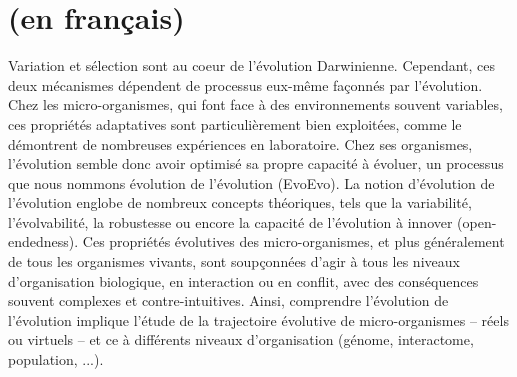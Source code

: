 

\section*{(en fran\c cais)}

Variation et s\'{e}lection sont au coeur de l'\'{e}volution Darwinienne. Cependant, ces deux m\'{e}canismes d\'{e}pendent de processus eux-m\^{e}me fa\c conn\'{e}s par l'\'{e}volution. Chez les micro-organismes, qui font face \`a des environnements souvent variables, ces propri\'{e}t\'{e}s adaptatives sont particuli\`erement bien exploit\'{e}es, comme le d\'{e}montrent de nombreuses exp\'{e}riences en laboratoire. Chez ses organismes, l'\'{e}volution semble donc avoir optimis\'{e} sa propre capacit\'{e} \`a \'{e}voluer, un processus que nous nommons \'{e}volution de l'\'{e}volution (EvoEvo).
La notion d'\'{e}volution de l'\'{e}volution englobe de nombreux concepts th\'{e}oriques, tels que la variabilit\'{e}, l'\'{e}volvabilit\'{e}, la robustesse ou encore la capacit\'{e} de l'\'{e}volution \`a innover (open-endedness). Ces propri\'{e}t\'{e}s \'{e}volutives des micro-organismes, et plus g\'{e}n\'{e}ralement de tous les organismes vivants, sont soup\c conn\'{e}es d'agir \`a tous les niveaux d'organisation biologique, en interaction ou en conflit, avec des cons\'{e}quences souvent complexes et contre-intuitives. Ainsi, comprendre l'\'{e}volution de l'\'{e}volution implique l'\'{e}tude de la trajectoire \'{e}volutive de micro-organismes -- r\'{e}els ou virtuels -- et ce \`a diff\'{e}rents niveaux d'organisation (g\'{e}nome, interactome, population, ...).

